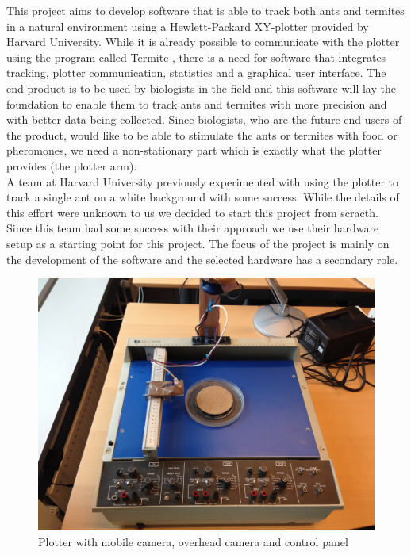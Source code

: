 This project aims to develop software that is able to track both ants and termites in a natural environment using a Hewlett-Packard XY-plotter provided by Harvard University. While it is already possible to communicate with the plotter using the program called Termite \cite{termite}, there is a need for software that integrates tracking, plotter communication, statistics and a graphical user interface. The end product is to be used by biologists in the field and this software will lay the foundation to enable them to track ants and termites with more precision and with better data being collected. Since biologists, who are the future end users of the product, would like to be able to stimulate the ants or termites with food or pheromones, we need a non-stationary part which is exactly what the plotter provides (the plotter arm). \\

A team at Harvard University previously experimented with using the plotter to track a single ant on a white background with some success. While the details of this effort were unknown to us we decided to start this project from scracth. Since this team had some success with their approach we use their hardware setup as a starting point for this project. The focus of the project is mainly on the development of the software and the selected hardware has a secondary role. \\

\begin{figure}
        \centering
        \includegraphics[scale=0.125]{img/plotter}
        \caption{Plotter with mobile camera, overhead camera and control panel}
        \label{fig:plotter}
\end{figure}

